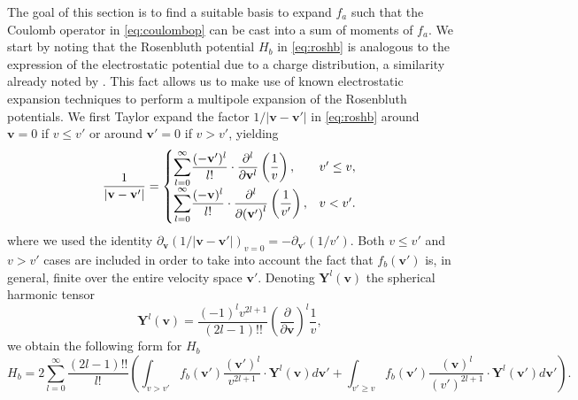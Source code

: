 The goal of this section is to find a suitable basis to expand $f_a$ such that the Coulomb operator in \cref{eq:coulombop} can be cast into a sum of moments of $f_a$.
%
We start by noting that the Rosenbluth potential $H_b$ in \cref{eq:roshb} is analogous to the expression of the electrostatic potential due to a charge distribution, a similarity already noted by \citet{Rosenbluth1957}.
%
This fact allows us to make use of known electrostatic expansion techniques \citep{Jackson1999} to perform a multipole expansion of the Rosenbluth potentials.
%
We first Taylor expand the factor $1/|\mathbf v - \mathbf v'|$ in \cref{eq:roshb} around $\mathbf v=0$ if $v\le v'$ or around $\mathbf v'=0$ if $v>v'$, yielding
%
\begin{equation}
\frac{1}{|\mathbf v - \mathbf v'|} =
\begin{cases}
    \mathlarger{\sum}\limits_{l=0}^\infty \dfrac{(-\mathbf v')^l}{l!} \cdot \dfrac{\partial^l}{\partial {\mathbf v}^l} \left(\dfrac{1}{v}\right), &v'\le v,\\
    \mathlarger{\sum}\limits_{l=0}^\infty \dfrac{(-\mathbf v)^l}{l!} \cdot \dfrac{\partial^l}{\partial {(\mathbf v')}^l} \left(\dfrac{1}{v'}\right), &v<v'.\\
\end{cases}
\end{equation}
%
where we used the identity $\partial_{\mathbf v}(1/|\mathbf v - \mathbf v'|)_{v=0}=-\partial_{\mathbf v'}(1/v')$.
%
Both $v\le v'$ and $v>v'$ cases are included in order to take into account the fact that $f_b(\mathbf v')$ is, in general, finite over the entire velocity space $\mathbf v'$.
%
Denoting $\mathbf Y^{l}(\mathbf v)$ the spherical harmonic tensor \citep{Weinert1980}
%
\begin{equation}
    \mathbf Y^{l}(\mathbf v) = \frac{(-1)^l v^{2l+1}}{(2l-1)!!}\left(\frac{\partial}{\partial \mathbf v}\right)^l \frac{1}{v},
\label{eq:yltensor}
\end{equation}
%
we obtain the following form for $H_b$
%
\begin{equation}
    H_b = 2 \sum_{l=0}^\infty \frac{(2l-1)!!}{l!} \left(\int_{v>v'} f_b(\mathbf v') \frac{(\mathbf v')^l}{v^{2l+1}} \cdot \mathbf Y^{l}(\mathbf v)  d\mathbf v'+\int_{v'\ge v} f_b(\mathbf v') \frac{(\mathbf v)^l}{(v')^{2l+1}} \cdot \mathbf Y^{l}(\mathbf v')  d\mathbf v'\right).
\label{eq:roshb1}
\end{equation}


